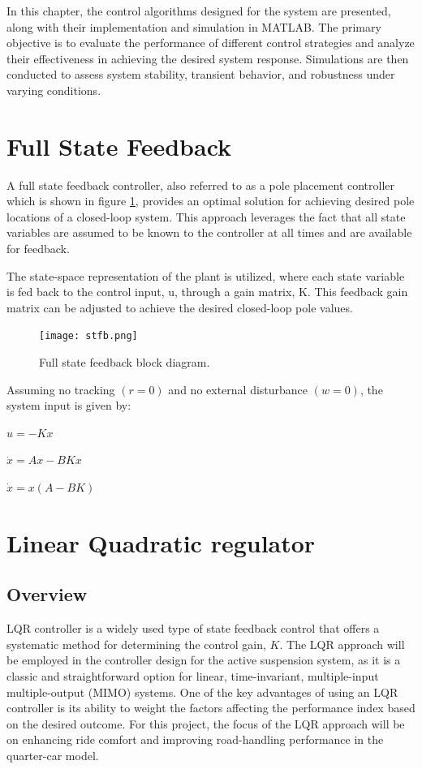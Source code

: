 In this chapter, the control algorithms designed for the system are presented, along with their implementation and simulation in MATLAB. The primary objective is to evaluate the performance of different control strategies and analyze their effectiveness in achieving the desired system response. Simulations are then conducted to assess system stability, transient behavior, and robustness under varying conditions.

\section{Full State Feedback}
A full state feedback controller, also referred to as a pole placement controller which is shown in figure \ref{fig:stfb}, provides an optimal solution for achieving desired pole locations of a closed-loop system. This approach leverages the fact that all state variables are assumed to be known to the controller at all times and are available for feedback.

The state-space representation of the plant is utilized, where each state variable is fed back to the control input, u, through a gain matrix, K. This feedback gain matrix can be adjusted to achieve the desired closed-loop pole values.

\begin{figure}[H]
	\centering
	\texttt{[image: stfb.png]}
	\caption{Full state feedback block diagram. \cite{controltutorials}
	}
	\label{fig:stfb}
\end{figure}

Assuming no tracking $(r=0)$ and no external disturbance $(w=0)$, the system input is given by:

$u = -Kx$

$\dot{x} = Ax - BKx$

$\dot{x} = x(A - BK)$

\section{Linear Quadratic regulator}
\subsection{Overview}
LQR controller is a widely used type of state feedback control that offers a systematic method for determining the control gain, $K$. The LQR approach will be employed in the controller design for the active suspension system, as it is a classic and straightforward option for linear, time-invariant, multiple-input multiple-output (MIMO) systems. One of the key advantages of using an LQR controller is its ability to weight the factors affecting the performance index based on the desired outcome. For this project, the focus of the LQR approach will be on enhancing ride comfort and improving road-handling performance in the quarter-car model.


